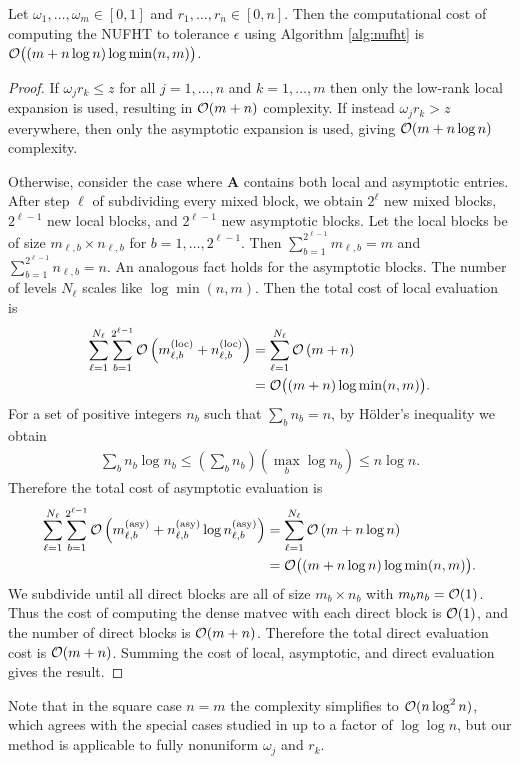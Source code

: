 \begin{theorem}
    Let $\omega_1,\dots,\omega_m \in [0,1]$ and $r_1,\dots,r_n \in [0,n]$. Then
    the computational cost of computing the NUFHT to tolerance $\epsilon$ using
    Algorithm \ref{alg:nufht} is $\mathcal{O}\big((m + n\log n) \log \min(n,m) \big)$.
\end{theorem}

\begin{proof}
    If $\omega_j r_k \leq z$ for all $j=1,\dots,n$ and $k=1,\dots,m$ then only
    the low-rank local expansion is used, resulting in $\mathcal{O}(m + n)$ complexity.
    If instead $\omega_j r_k > z$ everywhere, then only the asymptotic expansion
    is used, giving $\mathcal{O}(m + n\log n)$ complexity.

    Otherwise, consider the case where $\bm{A}$ contains both local and
    asymptotic entries. After step $\ell$ of subdividing every mixed block, we
    obtain $2^{\ell}$ new mixed blocks, $2^{\ell-1}$ new local blocks, and
    $2^{\ell-1}$ new asymptotic blocks. Let the local blocks be of size
    $m_{\ell,b} \times n_{\ell,b}$ for $b = 1,\dots,2^{\ell-1}$. Then
    $\sum_{b=1}^{2^{\ell-1}} m_{\ell,b} = m$ and $\sum_{b=1}^{2^{\ell-1}}
    n_{\ell,b} = n$. An analogous fact holds for the asymptotic blocks. The
    number of levels $N_\ell$ scales like $\log\min(n,m)$. Then the total cost
    of local evaluation is 
    \begin{align}
        \sum_{\ell=1}^{N_\ell} \sum_{b=1}^{2^{\ell-1}} \mathcal{O}\left(m_{\ell,b}^{(\text{loc})} + n_{\ell,b}^{(\text{loc})}\right)
        &= \sum_{\ell=1}^{N_\ell} \mathcal{O}\left(m + n\right) \\
        &= \mathcal{O}\big((m + n) \log \min(n,m)\big).
    \end{align}
    For a set of positive integers $n_b$ such that $\sum_b n_b = n$, by
    H\"older's inequality we obtain
    \begin{align}
        \sum_{b} n_b \log n_b 
        \leq \left( \sum_{b} n_b \right) \left(\max_b \log n_b\right)
        \leq n \log n.
    \end{align}
    Therefore the total cost of asymptotic evaluation is
    \begin{align}
        \sum_{\ell=1}^{N_\ell} \sum_{b=1}^{2^{\ell-1}} \mathcal{O}\left(m_{\ell,b}^{(\text{asy})} + n_{\ell,b}^{(\text{asy})} \log n_{\ell,b}^{(\text{asy})}\right)
        &= \sum_{\ell=1}^{N_\ell} \mathcal{O}\left(m + n \log n\right) \\
        &= \mathcal{O}\big((m + n\log n) \log \min(n,m) \big).
    \end{align}
    We subdivide until all direct blocks are all of size $m_b \times n_b$ with
    $m_bn_b = \mathcal{O}(1)$. Thus the cost of computing the dense matvec with each
    direct block is $\mathcal{O}(1)$, and the number of direct blocks is $\mathcal{O}(m + n)$.
    Therefore the total direct evaluation cost is $\mathcal{O}(m + n)$. Summing the cost
    of local, asymptotic, and direct evaluation gives the result.
\end{proof}

Note that in the square case $n=m$ the complexity simplifies to $\mathcal{O}(n\log^2n)$,
which agrees with the special cases studied in \cite{townsend2015fast} up to a
factor of $\log\log n$, but our method is applicable to fully nonuniform
$\omega_j$ and $r_k$.